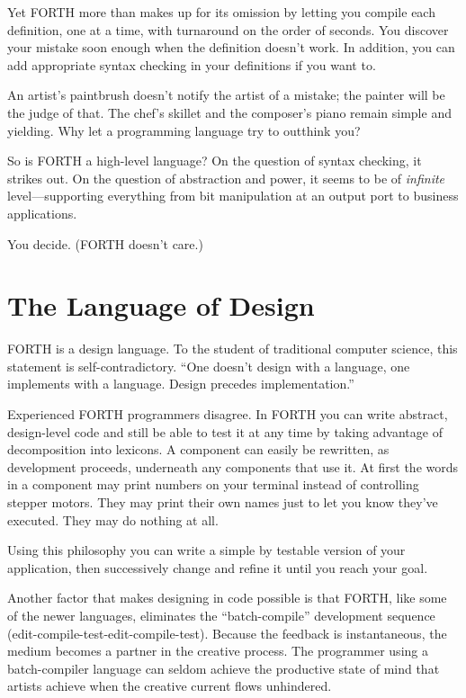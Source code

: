 Yet FORTH more than makes up for its omission by letting you compile
each definition, one at a time, with turnaround on the order of seconds.
You discover your mistake soon enough when the definition doesn't
work. In addition, you can add appropriate syntax checking in your
definitions if you want to.

An artist's paintbrush doesn't notify the artist of a mistake; the
painter will be the judge of that. The chef's skillet and the composer's
piano remain simple and yielding. Why let a programming language try
to outthink you?

So is FORTH a high-level language? On the question of syntax checking,
it strikes out. On the question of abstraction and power, it seems
to be of \emph{infinite} level---supporting everything from bit manipulation
at an output port to business applications.

You decide. (FORTH doesn't care.)


\section*{The Language of Design}

FORTH is a design language. To the student of traditional computer
science, this statement is self-contradictory. {}``One doesn't design
with a language, one implements with a language. Design precedes implementation.''

Experienced FORTH programmers disagree. In FORTH you can write abstract,
design-level code and still be able to test it at any time by taking
advantage of decomposition into lexicons. A component can easily be
rewritten, as development proceeds, underneath any components that
use it. At first the words in a component may print numbers on your
terminal instead of controlling stepper motors. They may print their
own names just to let you know they've executed. They may do nothing
at all.

Using this philosophy you can write a simple by testable version of
your application, then successively change and refine it until you
reach your goal.

Another factor that makes designing in code possible is that FORTH,
like some of the newer languages, eliminates the {}``batch-compile''
development sequence (edit-compile-test-edit-compile-test). Because
the feedback is instantaneous, the medium becomes a partner in the
creative process. The programmer using a batch-compiler language can
seldom achieve the productive state of mind that artists achieve when
the creative current flows unhindered.

